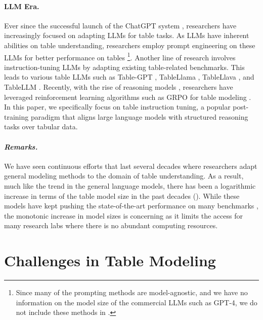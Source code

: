 \documentclass[11pt]{article}
\begin{document}
\paragraph{LLM Era.}
Ever since the successful launch of the ChatGPT system \citep{ouyang2022training}, researchers have increasingly focused on adapting LLMs for table tasks.
As LLMs have inherent abilities on table understanding, researchers employ prompt engineering on these LLMs for better performance on tables \citep{chang2023prompt, deng-etal-2024-tables}\footnote{Since many of the prompting methods are model-agnostic, and we have no information on the model size of the commercial LLMs such as GPT-4, we do not include these methods in .}.
Another line of research involves instruction-tuning LLMs by adapting existing table-related benchmarks.
This leads to various table LLMs such as Table-GPT \citep{li2023table}, TableLlama \citep{zhang-etal-2024-tablellama}, TableLlava \citep{zheng-etal-2024-multimodal}, and TableLLM \citep{zhang2024tablellm}. 
Recently, with the rise of reasoning models \citep{guo2025deepseek}, researchers have leveraged reinforcement learning algorithms such as GRPO \citep{shao2024deepseekmath} for table modeling \citep{yang2025table, wu2025table}.
In this paper, we specifically focus on table instruction tuning, a popular post-training paradigm that aligns large language models with structured reasoning tasks over tabular data.

\paragraph{\textit{Remarks.}}
We have seen continuous efforts that last several decades where researchers adapt general modeling methods to the domain of table understanding.
As a result, much like the trend in the general language models, there has been a logarithmic increase in terms of the table model size in the past decades ().
While these models have kept pushing the state-of-the-art performance on many benchmarks \citep{zhang-etal-2024-tablellama}, the monotonic increase in model sizes is concerning as it limits the access for many research labs where there is no abundant computing resources.

\section{Challenges in Table Modeling}
\label{app-sec: challenges-in-table-modeling}
\end{document}
